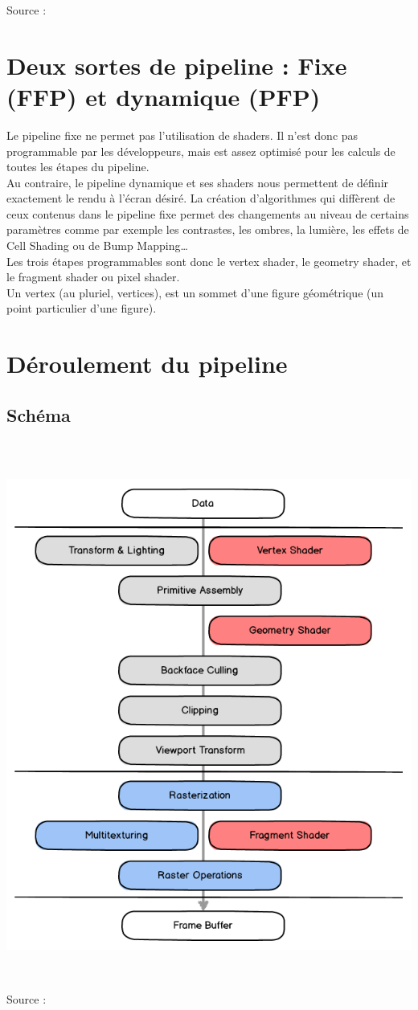 Source : \cite{histoirePipeline}

\section{Deux sortes de pipeline : Fixe (FFP) et dynamique (PFP)}
Le pipeline fixe ne permet pas l'utilisation de shaders. Il n’est donc pas programmable par les développeurs, mais est assez optimisé pour les calculs de toutes les étapes du pipeline.
\\
Au contraire, le pipeline dynamique et ses shaders nous permettent de définir exactement le rendu à l’écran désiré. La création d’algorithmes qui diffèrent de ceux contenus dans le pipeline fixe permet des changements au niveau de certains paramètres comme par exemple les contrastes, les ombres, la lumière, les effets de Cell Shading ou de Bump Mapping…
\\
Les trois étapes programmables sont donc le vertex shader, le geometry shader, et le fragment shader ou pixel shader.
\\
Un vertex (au pluriel, vertices), est un sommet d’une figure géométrique (un point particulier d’une figure).

\section{Déroulement du pipeline}
\subsection{Schéma}
\includegraphics[width=14cm,height=180mm]{pipeline/images/pipeline.png}
Source : \cite{pipeline1}
\newpage
